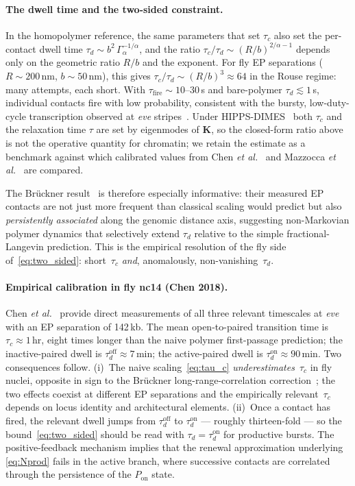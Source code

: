 \documentclass[11pt]{article}
\begin{document}
\paragraph{The dwell time and the two-sided constraint.} In the homopolymer
reference, the same parameters that set $\tau_c$ also set the per-contact
dwell time $\tau_d \sim b^{2}\,\Gamma_{\alpha}^{-1/\alpha}$, and the ratio
$\tau_c/\tau_d \sim (R/b)^{2/\alpha-1}$ depends only on the geometric ratio
$R/b$ and the exponent. For fly EP separations ($R\!\sim\!200$\,nm,
$b\!\sim\!50$\,nm), this gives $\tau_c/\tau_d \sim (R/b)^{3} \approx 64$
in the Rouse regime: many attempts, each short. With
$\tau_{\mathrm{fire}} \sim 10\text{--}30$\,s and bare-polymer
$\tau_d \lesssim 1$\,s, individual contacts fire with low probability,
consistent with the bursty, low-duty-cycle transcription observed at
\textit{eve} stripes~\cite{Bothma2014,Lammers2020}. Under
HIPPS-DIMES~\cite{Shi2025} both $\tau_c$ and the relaxation time $\tau$
are set by eigenmodes of $\mathbf{K}$, so the closed-form ratio above is
not the operative quantity for chromatin; we retain the estimate as a
benchmark against which calibrated values from Chen
\textit{et al.}~\cite{Chen2018} and Mazzocca
\textit{et al.}~\cite{Mazzocca2024} are compared.

The Br\"uckner result~\cite{Bruckner2023} is therefore especially
informative: their measured EP contacts are not just more frequent than
classical scaling would predict but also \emph{persistently associated}
along the genomic distance axis, suggesting non-Markovian polymer
dynamics that selectively extend $\tau_d$ relative to the simple
fractional-Langevin prediction. This is the empirical resolution of the
fly side of~\eqref{eq:two_sided}: short~$\tau_c$ \emph{and}, anomalously,
non-vanishing~$\tau_d$.

\paragraph{Empirical calibration in fly nc14 (Chen 2018).} Chen
\textit{et al.}~\cite{Chen2018} provide direct measurements of all three
relevant timescales at \textit{eve} with an EP separation of 142\,kb. The
mean open-to-paired transition time is $\tau_c \approx 1$\,hr, eight times
longer than the naive polymer first-passage prediction; the inactive-paired
dwell is $\tau_d^{\mathrm{off}}\approx 7$\,min; the active-paired dwell is
$\tau_d^{\mathrm{on}}\approx 90$\,min. Two consequences follow. (i)~The
naive scaling~\eqref{eq:tau_c} \emph{underestimates}~$\tau_c$ in fly nuclei,
opposite in sign to the Br\"uckner long-range-correlation
correction~\cite{Bruckner2023}; the two effects coexist at different EP
separations and the empirically relevant~$\tau_c$ depends on locus identity
and architectural elements. (ii)~Once a contact has fired, the relevant
dwell jumps from $\tau_d^{\mathrm{off}}$ to $\tau_d^{\mathrm{on}}$ ---
roughly thirteen-fold --- so the bound~\eqref{eq:two_sided} should be read
with $\tau_d = \tau_d^{\mathrm{on}}$ for productive bursts. The
positive-feedback mechanism implies that the renewal approximation
underlying \eqref{eq:Nprod} fails in the active branch, where successive
contacts are correlated through the persistence of the $P_{\mathrm{on}}$
state.
\end{document}
